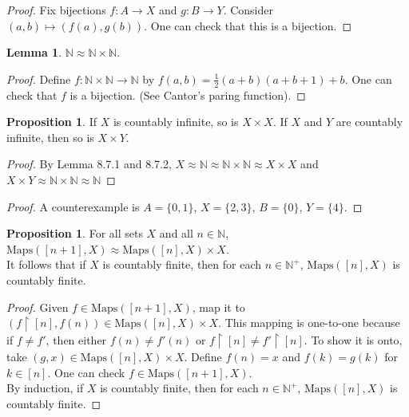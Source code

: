 \documentclass[14pt]{article}
\theoremstyle{definition}
\newtheorem{proposition}[definition]{Proposition}
\newtheorem{lemma}[definition]{Lemma}
\newcommand{\fun}[3]{#1\colon #2\rightarrow#3}
\newcommand{\bb}[1]{\mathbb{#1}}
\newcommand{\restrict}{\upharpoonright}
\begin{document}
\begin{proof}
    Fix bijections $\fun{f}{A}{X}$ and $\fun{g}{B}{Y}$. Consider $(a,b)\mapsto (f(a), g(b))$.
    One can check that this is a bijection.
\end{proof}

\vspace{2mm}

\begin{lemma}
    $\bb{N}\approx \bb{N}\times \bb{N}$.
\end{lemma}
\begin{proof}
    Define $\fun{f}{\bb{N}\times \bb{N}}{\bb{N}}$ by $f(a,b)=\frac{1}{2}(a+b)(a+b+1)+b$.
   One can check that $f$ is a bijection. (See Cantor's paring function).
\end{proof}
\vspace{2mm}

\begin{proposition}
    If $X$ is countably infinite, so is $X \times X$. If $X$ and $Y$ are countably infinite,
    then so is $X\times Y$.
\end{proposition}

\begin{proof}
    By Lemma 8.7.1 and 8.7.2,  $X\approx \bb{N}\approx \bb{N}\times \bb{N}\approx X\times X$ and 
    $X\times Y\approx \bb{N}\times \bb{N}\approx \bb{N} $
\end{proof}

\begin{proof}
    A counterexample is $A=\{0,1\}$, $X=\{2,3\}$, $B=\{0\}$, $Y=\{4\}$.
\end{proof}

\vspace{2mm}

\begin{proposition}
    For all sets $X$ and all $n\in \bb{N}$, $\mathrm{Maps}([n+1], X)\approx \mathrm{Maps}([n], X)\times X$.\\
    It follows that if $X$ is countably finite, then for each $n\in \bb{N}^+$, $\mathrm{Maps}([n], X)$ is countably finite.
\end{proposition}

\begin{proof}
    Given $f\in \mathrm{Maps}([n+1], X) $, map it to $(f\restrict[n], f(n))\in \mathrm{Maps}([n], X)\times X$. 
    This mapping is one-to-one because if $f\not= f'$, then either $f(n)\not=f'(n)$ or
    $f\restrict [n]\not=f'\restrict [n]$. To show it is onto, take $(g, x)\in \mathrm{Maps}([n], X)\times X$.
    Define $f(n)=x$ and $f(k)=g(k)$ for $k\in [n]$. One can check $f\in \mathrm{Maps}([n+1], X) $.\\
    By induction, if $X$ is countably finite, then for each $n\in \bb{N}^+$, $\mathrm{Maps}([n], X)$ is countably finite.

\end{proof}
\end{document}
